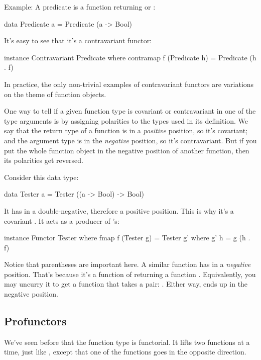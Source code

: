 \documentclass[DaoFP]{subfiles}
\begin{document}
Example: A predicate is a function returning  or :
\begin{haskell}
data Predicate a = Predicate (a -> Bool)
\end{haskell}
It's easy to see that it's a contravariant functor:
\begin{haskell}
instance Contravariant Predicate where
  contramap f (Predicate h) = Predicate (h . f)
\end{haskell}

In practice, the only non-trivial examples of contravariant functors are variations on the theme of function objects. 

One way to tell if a given function type is covariant or contravariant in one of the type arguments is by assigning polarities to the types used in its definition. We say that the return type of a function is in a \emph{positive} position, so it's covariant; and the argument type is in the \emph{negative} position, so it's contravariant. But if you put the whole function object in the negative position of another function, then its polarities get reversed. 

Consider this data type:
\begin{haskell}
data Tester a = Tester ((a -> Bool) -> Bool)
\end{haskell}
It has  in a double-negative, therefore a positive position. This is why it's a covariant . It acts as a producer of 's:

\begin{haskell}
instance Functor Tester where
  fmap f (Tester g) = Tester g'
    where g' h = g (h . f)
\end{haskell}

Notice that parentheses are important here. A similar function  has  in a \emph{negative} position. That's because it's a function of  returning a function . Equivalently, you may uncurry it to get a function that takes a pair: . Either way,  ends up in the negative position.

\subsection{Profunctors}

We've seen before that the function type is functorial. It lifts two functions at a time, just like , except that one of the functions goes in the opposite direction. 
\end{document}
